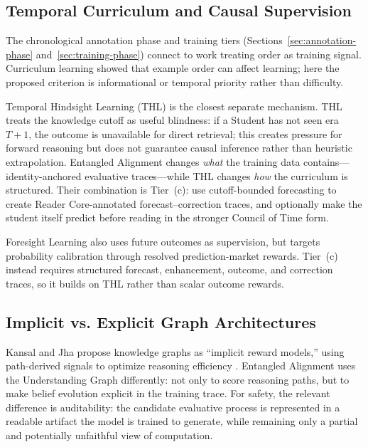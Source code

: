 \subsection{Temporal Curriculum and Causal Supervision}

The chronological annotation phase and training tiers
(Sections~\ref{sec:annotation-phase} and~\ref{sec:training-phase}) connect to
work treating order as training signal. Curriculum learning
\cite{bengio2009curriculum} showed that example order can affect learning; here
the proposed criterion is informational or temporal priority rather than
difficulty.

Temporal Hindsight Learning (THL) \cite{westerberg2026thl} is the closest
separate mechanism. THL treats the knowledge cutoff as useful blindness: if a
Student has not seen era $T+1$, the outcome is unavailable for direct retrieval;
this creates pressure for forward reasoning but does not guarantee causal
inference rather than heuristic extrapolation. Entangled
Alignment changes \emph{what} the training data contains---identity-anchored
evaluative traces---while THL changes \emph{how} the curriculum is structured.
Their combination is Tier~(c): use cutoff-bounded forecasting to create
Reader Core-annotated forecast--correction traces, and optionally make the
student itself predict before reading in the stronger Council of Time form.

Foresight Learning \cite{turtel2025foresight, turtel2025rlvr,
turtel2026futureaslabel} also uses future outcomes as supervision, but targets
probability calibration through resolved prediction-market rewards. Tier~(c)
instead requires structured forecast, enhancement, outcome, and correction
traces, so it builds on THL rather than scalar outcome rewards.

\subsection{Implicit vs. Explicit Graph Architectures}

Kansal and Jha propose knowledge graphs as ``implicit reward models,'' using
path-derived signals to optimize reasoning efficiency
\cite{kansal2026knowledgegraphsimplicitreward}. Entangled Alignment uses the
Understanding Graph differently: not only to score reasoning paths, but to make
belief evolution explicit in the training trace. For safety, the relevant
difference is auditability: the candidate evaluative process is represented in
a readable artifact the model is trained to generate, while remaining only a
partial and potentially unfaithful view of computation.

